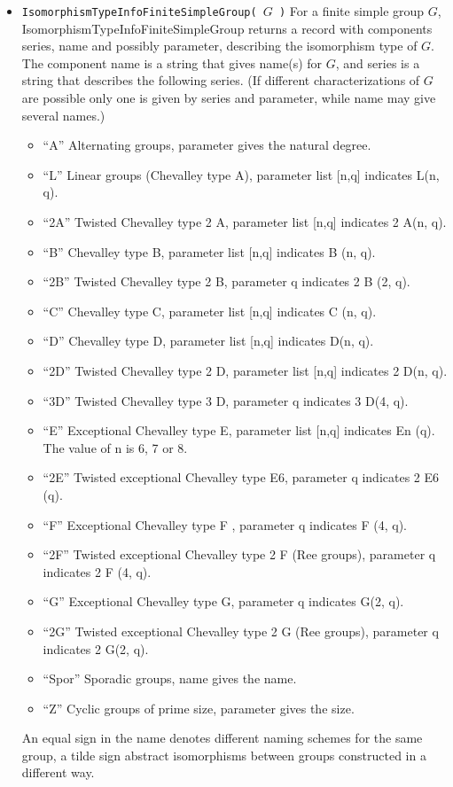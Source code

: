 \begin{itemize}
\item\protect\footnotemark
{}
{\tt IsomorphismTypeInfoFiniteSimpleGroup( $G$ )}
For a finite simple group $G$, IsomorphismTypeInfoFiniteSimpleGroup returns a record with components
series, name and possibly parameter, describing the isomorphism type of $G$. The component name is a
string that gives name(s) for $G$, and series is a string that describes the following series.
(If different characterizations of $G$ are possible only one is given by series and parameter, while name may
give several names.)
{\footnotesize
\begin{itemize}
\item 
``A'' Alternating groups, parameter gives the natural degree.
\item 
``L'' Linear groups (Chevalley type A), parameter list [n,q] indicates L(n, q).
\item 
``2A'' Twisted Chevalley type 2 A, parameter list [n,q] indicates 2 A(n, q).
\item 
``B'' Chevalley type B, parameter list [n,q] indicates B (n, q).
\item 
``2B'' Twisted Chevalley type 2 B, parameter q indicates 2 B (2, q).
\item 
``C'' Chevalley type C, parameter list [n,q] indicates C (n, q).
\item 
``D'' Chevalley type D, parameter list [n,q] indicates D(n, q).
\item 
``2D'' Twisted Chevalley type 2 D, parameter list [n,q] indicates 2 D(n, q).
\item 
``3D'' Twisted Chevalley type 3 D, parameter q indicates 3 D(4, q).
\item 
``E'' Exceptional Chevalley type E, parameter list [n,q] indicates En (q). \\The value of n is 6, 7 or 8.
\item 
``2E'' Twisted exceptional Chevalley type E6, parameter q indicates 2 E6 (q).
\item 
``F'' Exceptional Chevalley type F , parameter q indicates F (4, q).
\item 
``2F'' Twisted exceptional Chevalley type 2 F (Ree groups), parameter q indicates 2 F (4, q).
\item 
``G'' Exceptional Chevalley type G, parameter q indicates G(2, q).
\item 
``2G'' Twisted exceptional Chevalley type 2 G (Ree groups), parameter q indicates 2 G(2, q).
\item 
``Spor'' Sporadic groups, name gives the name.
\item 
``Z'' Cyclic groups of prime size, parameter gives the size.
\end{itemize}
}
An equal sign in the name denotes different naming schemes for the same group, a tilde sign abstract
isomorphisms between groups constructed in a different way.

\end{itemize}
